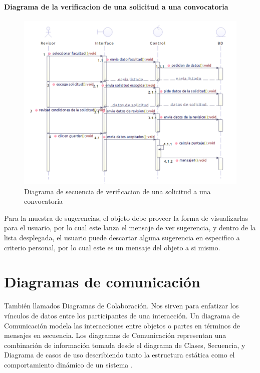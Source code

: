 \paragraph{Diagrama de la verificacion de una solicitud a una convocatoria}
\begin{figure}[H]
	\centering
	\includegraphics[width=0.8\linewidth]{parte2/imgs/DiagramaSecuencia/SecVerifSolConv}
	\caption[Diagrama de secuencia Verificacion de solicitud]{Diagrama de secuencia de verificacion de una solicitud a una convocatoria}
	\label{fig:diagramadesecuencia4}
\end{figure}

Para la muestra de sugerencias, el objeto debe proveer la forma de visualizarlas para el usuario, por lo cual este lanza el mensaje de ver sugerencia, y dentro de la lista desplegada, el usuario puede descartar alguna sugerencia en especifico a criterio personal, por lo cual este es un mensaje del objeto a si mismo.

\newpage

\section{Diagramas de comunicación}

También llamados Diagramas de Colaboración. Nos sirven para enfatizar los vínculos de datos entre los participantes de una interacción. Un diagrama de Comunicación modela las interacciones entre objetos o partes en términos de mensajes en secuencia. Los diagramas de Comunicación representan una combinación de información tomada desde el diagrama de Clases, Secuencia, y Diagrama de casos de uso describiendo tanto la estructura estática como el comportamiento dinámico de un sistema \cite{Pw4DC}.

